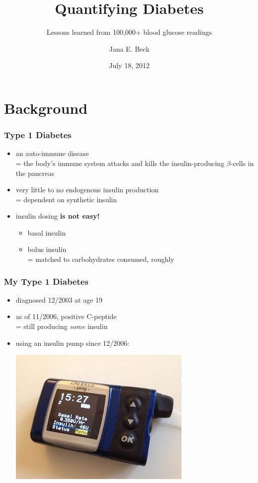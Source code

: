 \documentclass{beamer}
\author{Jana E. Beck}
\title{Quantifying Diabetes}
\subtitle{Lessons learned from 100,000+ blood glucose readings}
\date{July 18, 2012}
\begin{document}
\begin{frame}
\maketitle
\end{frame}

\section{Background}

\begin{frame}
  \frametitle{Type 1 Diabetes}

  \begin{itemize}
  \item an auto-immune disease \pause \\
    = the body's immune system attacks and kills the insulin-producing $\beta$-cells in the
    pancreas
  \pause
  \item very little to no endogenous insulin production \pause \\
    = dependent on synthetic insulin
  \pause
  \item insulin dosing \pause \textbf{is not easy!}
    \begin{itemize}
    \pause
    \item basal insulin
    \pause
    \item bolus insulin \pause \\
      = matched to carbohydrates consumed, roughly
    \end{itemize}
  \end{itemize}

\end{frame}

\begin{frame}
  \frametitle{My Type 1 Diabetes}

  \begin{itemize}
  \item diagnosed 12/2003 at age 19
  \item as of 11/2006, positive C-peptide \pause \\
    = still producing \textit{some} insulin
  \pause
  \item using an insulin pump since 12/2006:
    \begin{center}
      \includegraphics[angle=180,width=.5\linewidth]{ping.jpg}
    \end{center}
  \end{itemize}
  
\end{frame}
\end{document}
